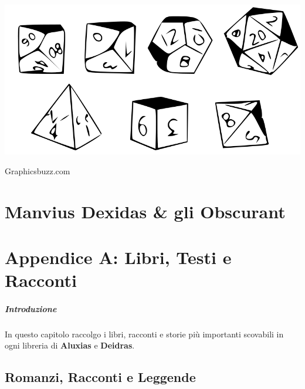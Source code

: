 \documentclass[10pt,twoside,onecolumn,openany]{book}
\begin{document}
\begin{center}
\includegraphics[scale=0.48]{dicedrawn}\\
\begin{tiny}
Graphicsbuzz.com
\end{tiny}
\end{center}
\newpage
\chapter{Manvius Dexidas \& gli Obscurant}
\newpage
\chapter{Appendice A: Libri, Testi e Racconti}
\paragraph{Introduzione} In questo capitolo raccolgo i libri, racconti e storie più importanti scovabili in ogni libreria di \textbf{Aluxias} e \textbf{Deidras}.
\section{Romanzi, Racconti e Leggende}
\end{document}
